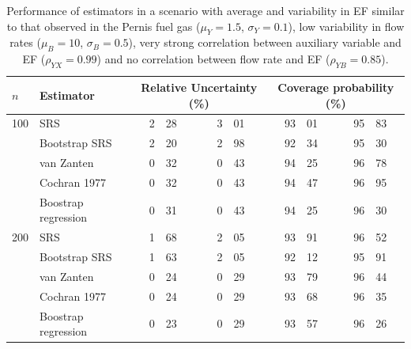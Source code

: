 \begin{table}
	\caption{Performance of estimators in a scenario with average and variability in EF similar to that observed in the Pernis fuel gas ($\mu_Y=1.5$, $\sigma_Y=0.1$), low variability in flow rates ($\mu_B=10$, $\sigma_B=0.5$), very strong correlation between auxiliary variable and EF ($\rho_{YX}=0.99$) and no correlation between flow rate and EF ($\rho_{YB}=0.85$).}
	\begin{tabular}{l l r@{.}l@{ - }r@{.}l r@{.}l@{ - }r@{.}l}
		\hline
		$n$ & Estimator & \multicolumn{4}{c}{Relative Uncertainty (\%)} & \multicolumn{4}{c}{Coverage probability (\%)} \\
		\hline
		100 & SRS 		 		& 2&28&3&01 & 93&01&95&83 \\
		    & Bootstrap SRS 	& 2&20&2&98 & 92&34&95&30 \\
		    & van Zanten   		& 0&32&0&43 & 94&25&96&78 \\
		    & Cochran 1977 		& 0&32&0&43 & 94&47&96&95 \\
		    & Boostrap regression & 0&31&0&43 & 94&25&96&30 \\
		\cline{2-10}
		200 & SRS 		 		& 1&68&2&05 & 93&91&96&52 \\
		    & Bootstrap SRS 	& 1&63&2&05 & 92&12&95&91 \\
		    & van Zanten   		& 0&24&0&29 & 93&79&96&44 \\
		    & Cochran 1977 		& 0&24&0&29 & 93&68&96&35 \\
		    & Boostrap regression & 0&23&0&29 & 93&57&96&26 \\
		\hline
	\end{tabular}\label{tab:batch4}
\end{table}


